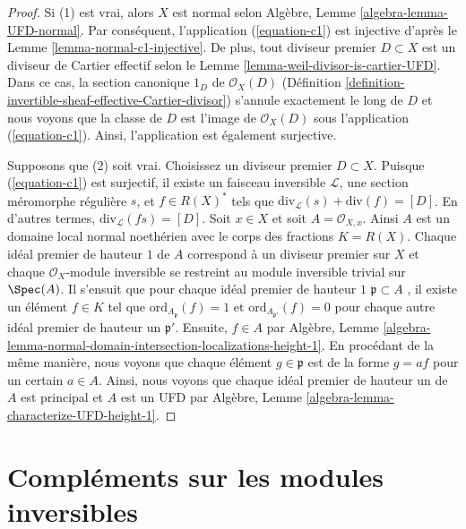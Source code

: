 \begin{proof}
Si (1) est vrai, alors  $X$  est normal selon Algèbre, Lemme  \ref{algebra-lemma-UFD-normal}.
Par conséquent, l'application (\ref{equation-c1}) est injective d'après le Lemme
 \ref{lemma-normal-c1-injective}. De plus, tout diviseur premier  $D \subset X$  est un diviseur de
Cartier effectif selon le Lemme  \ref{lemma-weil-divisor-is-cartier-UFD}. Dans ce cas, la section canonique
 $1_D$  de  $\mathcal{O}_X(D)$  (Définition  \ref{definition-invertible-sheaf-effective-Cartier-divisor}) s'annule exactement le long
de  $D$  et nous voyons que la classe de  $D$  est l'image de
 $\mathcal{O}_X(D)$  sous l'application (\ref{equation-c1}). Ainsi, l'application est également
surjective.

\medskip\noindent
Supposons que (2) soit vrai. Choisissez un diviseur premier  $D \subset X$. Puisque
(\ref{equation-c1}) est surjectif, il existe un faisceau inversible  $\mathcal{L}$, une
section méromorphe régulière  $s$, et  $f \in R(X)^*$  tels que  $\text{div}_\mathcal{L}(s) + \text{div}(f) = [D]$.
En d'autres termes,  $\text{div}_\mathcal{L}(fs) = [D]$. Soit  $x \in X$  et soit  $A = \mathcal{O}_{X, x}$. Ainsi
 $A$  est un domaine local normal noethérien avec le corps des fractions
 $K = R(X)$. Chaque idéal premier de hauteur  $1$  de  $A$ 
correspond à un diviseur premier sur  $X$  et chaque  $\mathcal{O}_X$-module
inversible se restreint au module inversible trivial sur  $\Spec(A)$. Il s'ensuit
que pour chaque idéal premier de hauteur  $1$   $\mathfrak p \subset A$ , il existe un
élément  $f \in K$  tel que  $\text{ord}_{A_\mathfrak p}(f) = 1$  et  $\text{ord}_{A_{\mathfrak p'}}(f) = 0$  pour chaque autre idéal
premier de hauteur un  $\mathfrak p'$. Ensuite,  $f \in A$  par Algèbre, Lemme
 \ref{algebra-lemma-normal-domain-intersection-localizations-height-1}. En procédant de la même manière, nous voyons que chaque élément
 $g \in \mathfrak p$  est de la forme  $g = af$  pour un certain  $a \in A$. Ainsi,
nous voyons que chaque idéal premier de hauteur un de  $A$  est principal
et  $A$  est un UFD par Algèbre, Lemme  \ref{algebra-lemma-characterize-UFD-height-1}.
\end{proof}







\section{Compléments sur les modules inversibles}
\label{section-invertible-modules}

